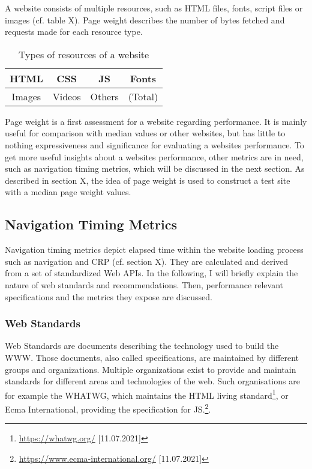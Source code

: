 A website consists of multiple resources, such as HTML files, fonts, script files or images (cf. table X).
Page weight describes the number of bytes fetched and requests made for each resource type. %

\begin{table}[h]
	\small
	\centering
	\begin{tabular}{| c | c | c | c | }
	\hline
	HTML & CSS  & JS & Fonts \\
	\hline
	Images & Videos & Others & (Total) \\
	\hline
	\end{tabular}
	\medskip
	\caption{Types of resources of a website}
	\label{table:website_resources} %
\end{table}

Page weight is a first assessment for a website regarding performance.
It is mainly useful for comparison with median values or other websites, but has little to nothing expressiveness and significance for evaluating a websites performance.
To get more useful insights about a websites performance, other metrics are in need, such as navigation timing metrics, which will be discussed in the next section.
As described in section X,  the idea of page weight is used to construct a test site with a median page weight values.




\subsection{Navigation Timing Metrics}
\label{subsection:navigation_timing_metrics}

Navigation timing metrics depict elapsed time within the website loading process such as navigation and CRP (cf.  section X).
They are calculated and derived from a set of standardized Web APIs.
In the following, I will briefly explain the nature of web standards and recommendations.
Then, performance relevant specifications and the metrics they expose are discussed.


\subsubsection{Web Standards}

Web Standards are documents describing the technology used to build the WWW. %
Those documents, also called specifications, are maintained by different groups and organizations.
Multiple organizations exist to provide and maintain standards for different areas and technologies of the web.
Such organisations are for example the WHATWG, which maintains the HTML living standard\footnote{\url{https://whatwg.org/} [11.07.2021]}, or Ecma International, providing the specification for JS.\footnote{\url{https://www.ecma-international.org/} [11.07.2021]}.

